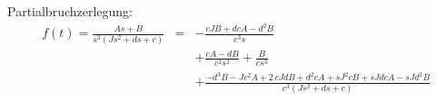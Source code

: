 Partialbruchzerlegung:
\begin{eqnarray*}
 f(t) = \frac{As + B}{s^3(J s^2 + d s + c)} &=&
 -{\frac {cJB+dcA-{d}^{2}B}{{c}^{3}s}}
 \\
 &&
 +{\frac {cA-dB}{{c}^{2}{s}^{2}}}
 +{\frac {B}{c{s}^{3}}}
 \\
 &&
 +{\frac
 {-{d}^{3}B-J{c}^{2}A+2\,cJdB+{d}^{2}cA+s{J}^{2}cB+sJdcA
 -sJ{d}^{2}B}{{c}^{3}\left
 (J{s}^{2}+ds+c\right )}}
\end{eqnarray*}
